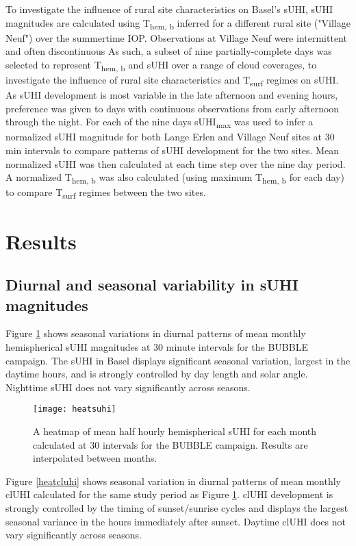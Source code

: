 \begin{bibunit}
To investigate the influence of rural site characteristics on Basel's sUHI, sUHI magnitudes are calculated using T\textsubscript{hem, b} inferred for a different rural site ("Village Neuf") over the summertime IOP. Observations at Village Neuf were intermittent and often discontinuous As such, a subset of nine partially-complete days was selected to represent T\textsubscript{hem, b} and sUHI over a range of cloud coverages, to investigate the influence of rural site characteristics and T\textsubscript{surf} regimes on sUHI. As sUHI development is most variable in the late afternoon and evening hours, preference was given to days with continuous observations from early afternoon through the night. For each of the nine days sUHI\textsubscript{max} was used to infer a normalized sUHI magnitude for both Lange Erlen and Village Neuf sites at 30 \si{\minute} intervals to compare patterns of sUHI development for the two sites. Mean normalized sUHI was then calculated at each time step over the nine day period. A normalized T\textsubscript{hem, b} was also calculated (using maximum T\textsubscript{hem, b} for each day) to compare T\textsubscript{surf} regimes between the two sites.

\section{Results}

\subsection{Diurnal and seasonal variability in sUHI magnitudes}

Figure \ref{heatsuhi} shows seasonal variations in diurnal patterns of mean monthly hemispherical sUHI magnitudes at 30 minute intervals for the BUBBLE campaign. The sUHI in Basel displays significant seasonal variation, largest in the daytime hours, and is strongly controlled by day length and solar angle. Nighttime sUHI does not vary significantly across seasons. 

\begin{figure}[H]
	\centering
	\texttt{[image: heatsuhi]}
	\caption{A heatmap of mean half hourly hemispherical sUHI for each month calculated at 30 \si{\min} intervals for the BUBBLE campaign. Results are interpolated between months.}
	\label{heatsuhi}
\end{figure}

Figure \ref{heatcluhi} shows seasonal variation in diurnal patterns of mean monthly clUHI calculated for the same study period as Figure \ref{heatsuhi}. clUHI development is strongly controlled by the timing of sunset/sunrise cycles and displays the largest seasonal variance in the hours immediately after sunset. Daytime clUHI does not vary significantly across seasons. 


\end{bibunit}
